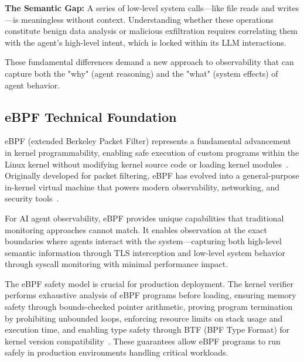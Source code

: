 \textbf{The Semantic Gap:} A series of low-level system calls—like file reads and writes—is meaningless without context. Understanding whether these operations constitute benign data analysis or malicious exfiltration requires correlating them with the agent's high-level intent, which is locked within its LLM interactions.

These fundamental differences demand a new approach to observability that can capture both the "why" (agent reasoning) and the "what" (system effects) of agent behavior.

\subsection{eBPF Technical Foundation}

eBPF (extended Berkeley Packet Filter) represents a fundamental advancement in kernel programmability, enabling safe execution of custom programs within the Linux kernel without modifying kernel source code or loading kernel modules~\cite{brendangregg}. Originally developed for packet filtering, eBPF has evolved into a general-purpose in-kernel virtual machine that powers modern observability, networking, and security tools~\cite{ebpfio,cilium}. 

For AI agent observability, eBPF provides unique capabilities that traditional monitoring approaches cannot match. It enables observation at the exact boundaries where agents interact with the system—capturing both high-level semantic information through TLS interception and low-level system behavior through syscall monitoring with minimal performance impact.

The eBPF safety model is crucial for production deployment. The kernel verifier performs exhaustive analysis of eBPF programs before loading, ensuring memory safety through bounds-checked pointer arithmetic, proving program termination by prohibiting unbounded loops, enforcing resource limits on stack usage and execution time, and enabling type safety through BTF (BPF Type Format) for kernel version compatibility~\cite{kerneldoc}. These guarantees allow eBPF programs to run safely in production environments handling critical workloads.
